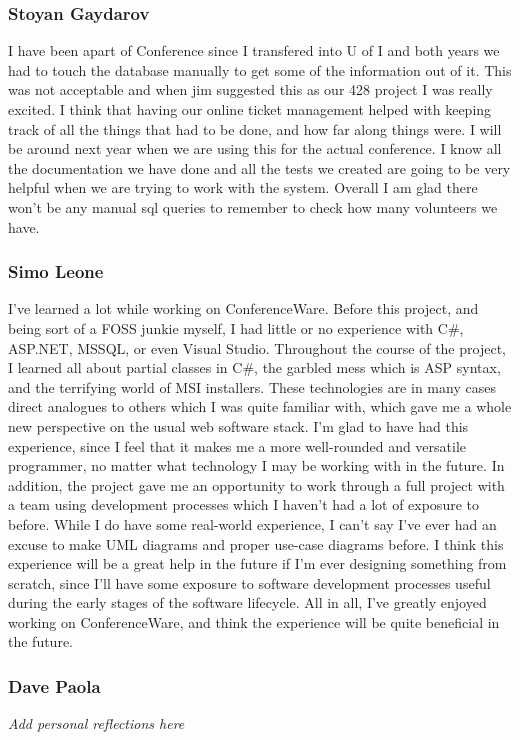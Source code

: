\documentclass[12pt]{article}
\begin{document}
\subsubsection{Stoyan Gaydarov}
I have been apart of Conference since I transfered into U of I and both years
we had to touch the database manually to get some of the information out of it.
This was not acceptable and when jim suggested this as our 428 project I was
really excited. I think that having our online ticket management helped with
keeping track of all the things that had to be done, and how far along things were.
I will be around next year when we are using this for the actual conference. I know
all the documentation we have done and all the tests we created are going to be
very helpful when we are trying to work with the system. Overall I am glad there
won't be any manual sql queries to remember to check how many volunteers we have.
\subsubsection{Simo Leone}
I've learned a lot while working on ConferenceWare. Before this project, and
being sort of a FOSS junkie myself, I had little or no experience with
C\#, ASP.NET, MSSQL, or even Visual Studio. Throughout the course of the project,
I learned all about partial classes in C\#, the garbled mess which is ASP syntax,
and the terrifying world of MSI installers. These technologies are in many cases
direct analogues to others which I was quite familiar with, which gave me a
whole new perspective on the usual web software stack. I'm glad to have had this
experience, since I feel that it makes me a more well-rounded and versatile
programmer, no matter what technology I may be working with in the future. In
addition, the project gave me an opportunity to work through a full project
with a team using development processes which I haven't had a lot of exposure
to before. While I do have some real-world experience, I can't say I've ever
had an excuse to make UML diagrams and proper use-case diagrams before. I
think this experience will be a great help in the future if I'm ever designing
something from scratch, since I'll have some exposure to software development
processes useful during the early stages of the software lifecycle. All in all,
I've greatly enjoyed working on ConferenceWare, and think the experience will
be quite beneficial in the future.
\subsubsection{Dave Paola}
\textit{Add personal reflections here}
\end{document}
